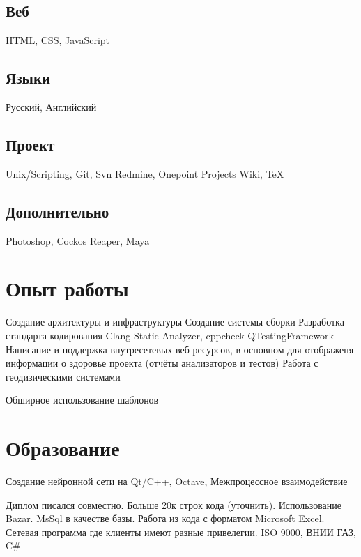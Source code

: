 \documentclass[a4paper]{curricula-vitae}
\begin{document}
\begin{minipage}[t]{0.33\textwidth}
\subsection{Веб}
HTML, CSS, JavaScript

\subsection{Языки}
Русский, Английский

\subsection{Проект}
Unix/Scripting, Git, Svn
Redmine, Onepoint Projects
Wiki, TeX

\subsection{Дополнительно}
Photoshop, 
Cockos Reaper, 
Maya

\end{minipage} %
\hfill
\begin{minipage}[t]{0.66\textwidth} %

\section{Опыт работы} 

Создание архитектуры и инфраструктуры
Создание системы сборки
Разработка стандарта кодирования
Clang Static Analyzer, cppcheck
QTestingFramework
Написание и поддержка внутресетевых веб ресурсов, в основном для отображеня
информации о здоровье проекта (отчёты анализаторов и тестов)
Работа с геодизическими системами

Обширное использование шаблонов

\section{Образование} 

Создание нейронной сети на Qt/C++, Octave, Межпроцессное взаимодействие

Диплом писался совместно. Больше 20к строк кода (уточнить). Использование Bazar.
MsSql в качестве базы. Работа из кода с форматом Microsoft Excel.
Сетевая программа где клиенты имеют разные привелегии.
ISO 9000, ВНИИ ГАЗ, C\#

\end{minipage} %

\end{document}
